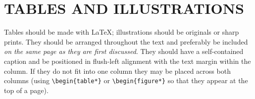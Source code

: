 
\section{TABLES AND ILLUSTRATIONS}

Tables should be made with \LaTeX; illustrations should be originals or
sharp prints. They should be arranged throughout the text and
preferably be included {\em on the same page as they are first
discussed}. They should have a self-contained caption and be positioned
in flush-left alignment with the text margin within the column. If they
do not fit into one column they may be placed across both columns
(using \verb-\begin{table*}- or \verb-\begin{figure*}- so that they
appear at the top of a page).

